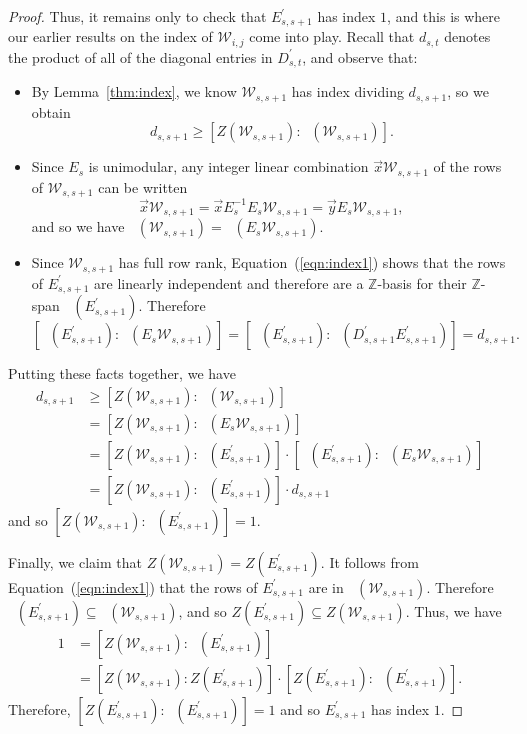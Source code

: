 \documentclass[11pt]{article}
\theoremstyle{definition}
\numberwithin{equation}{section}
\numberwithin{equation}{section}
\newcommand{\Z}[0]{\mathbb{Z}}
\DeclareMathOperator{\rowz}{row_{\mathbb{Z}}}
\DeclareMathOperator{\rowq}{row_{\mathbb{Q}}}
\newcommand{\W}{\mathcal{W}}
\begin{document}
\begin{proof}
Thus, it remains only to check that $E_{s,s+1}^{\prime}$ has index $1$, and this is where our earlier results on the index of $\W_{i,j}$ come into play.  Recall that $d_{s,t}$ denotes the product of all of the diagonal entries in $D_{s,t}^{\prime}$, and observe that:
\begin{itemize}
\item By Lemma~\ref{thm:index}, we know $\W_{s,s+1}$ has index dividing $d_{s,s+1}$, so we obtain 
\[ d_{s,s+1} \geq [Z(\W_{s,s+1}) : \rowz(\W_{s,s+1})]. \]

\item Since $E_{s}$ is unimodular, any integer linear combination $\vec{x}\W_{s,s+1}$ of the rows of $\W_{s,s+1}$ can be written
\[
\vec{x}\W_{s,s+1} = \vec{x}E_{s}^{-1} E_{s}\W_{s,s+1} = \vec{y}E_{s}\W_{s,s+1},
\]
and so we have $\rowz(\W_{s,s+1}) = \rowz(E_{s}\W_{s,s+1})$. 

\item Since $\W_{s,s+1}$ has full row rank, Equation~(\ref{eqn:index1}) shows that the rows of $E_{s,s+1}^{\prime}$ are linearly independent and therefore are a $\Z$-basis for their $\Z$-span $\rowz(E_{s,s+1}^{\prime})$.  Therefore 
\[ [\rowz(E_{s,s+1}^{\prime}) : \rowz(E_{s}\W_{s,s+1})] = [\rowz(E_{s,s+1}^{\prime}) : \rowz(D_{s,s+1}^{\prime} E_{s,s+1}^{\prime})] = d_{s,s+1}. \]
\end{itemize}
Putting these facts together, we have
\begin{align*}
    d_{s,s+1} &\geq [Z(\W_{s,s+1}) : \rowz(\W_{s,s+1})]\\
    &= [Z(\W_{s,s+1}) : \rowz(E_{s}\W_{s,s+1})]\\
    &= [Z(\W_{s,s+1}) : \rowz(E_{s,s+1}^{\prime})] \cdot [\rowz(E_{s,s+1}^{\prime}) : \rowz(E_{s}\W_{s,s+1})]\\
    &= [Z(\W_{s,s+1}) : \rowz(E_{s,s+1}^{\prime})] \cdot d_{s,s+1}
\end{align*}
and so $[Z(\W_{s,s+1}) : \rowz(E_{s,s+1}^{\prime})]=1$.

Finally, we claim that $Z(\W_{s,s+1}) = Z(E_{s,s+1}^{\prime})$.  It follows from Equation~(\ref{eqn:index1}) that the rows of $E_{s,s+1}^{\prime}$ are in $\rowq(\W_{s,s+1})$.  Therefore $\rowq(E_{s,s+1}^{\prime}) \subseteq \rowq(\W_{s,s+1})$, and so $Z(E_{s,s+1}^{\prime}) \subseteq Z(\W_{s,s+1})$.
Thus, we have
\begin{align*}
1 &= [Z(\W_{s,s+1}) : \rowz(E_{s,s+1}^{\prime})]\\
&= [Z(\W_{s,s+1}) : Z(E_{s,s+1}^{\prime})] \cdot [Z(E_{s,s+1}^{\prime}) : \rowz(E_{s,s+1}^{\prime})].
\end{align*}
Therefore, $[Z(E_{s,s+1}^{\prime}) : \rowz(E_{s,s+1}^{\prime})]=1$ and so $E_{s,s+1}^{\prime}$ has index $1$.
\end{proof}
\end{document}

